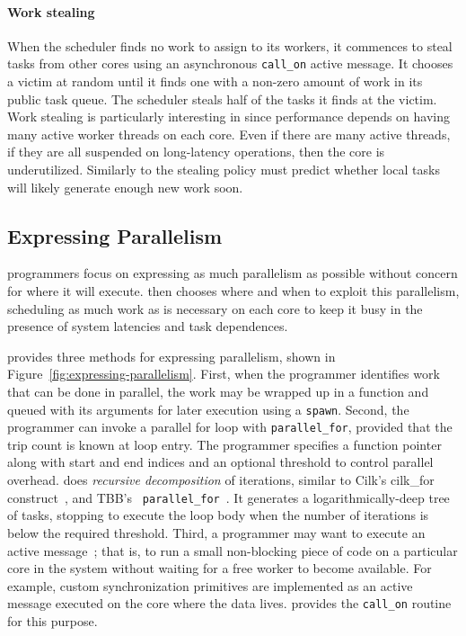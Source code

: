 \paragraph{Work stealing} 
When the scheduler finds no work to assign to its workers, it commences to
steal tasks from other cores using an asynchronous \texttt{call\_on} active
message. It chooses a victim at random until it finds one with a non-zero
amount of work in its public task queue. The scheduler steals half of the
tasks it finds at the victim. Work stealing is particularly interesting in
\Grappa since performance depends on having many active worker threads on each
core. Even if there are many active threads, if they are all suspended on
long-latency operations, then the core is underutilized. Similarly to
\cite{the_hierarchical_workstealing} the
stealing policy must predict whether local tasks will likely
generate enough new work soon.

\subsection{Expressing Parallelism}


\Grappa programmers focus on expressing as much parallelism as possible
without concern for where it will execute. \Grappa then chooses where and when
to exploit this parallelism, scheduling as much work as is necessary on each
core to keep it busy in the presence of system latencies and task dependences.

\Grappa provides three methods for expressing parallelism, shown in
Figure~\ref{fig:expressing-parallelism}. First, when the programmer identifies
work that can be done in parallel, the work may be wrapped up in a function
and queued with its arguments for later execution using a \texttt{spawn}.
Second,
the programmer can invoke a parallel for loop with \texttt{parallel\_for}, provided that the trip count is
known at loop entry. The programmer specifies a function pointer along with
start and end indices and an optional threshold to control parallel overhead.
\Grappa does {\em recursive decomposition} of iterations, similar to Cilk's
cilk\_for construct~\cite {cilkforimplementation}, and TBB's {\tt
parallel\_for}~\cite{intel_tbb}. It generates a logarithmically-deep tree of
tasks, stopping to execute the loop body when the number of iterations is
below the required threshold. Third, a programmer may want to execute an active message~\cite{vonEicken92}; that is, to run a
small non-blocking piece of code on a particular core in the system without waiting for
 a free worker to become available. For example, custom synchronization primitives are implemented as an active message executed on the core where the data
lives. \Grappa provides the \texttt{call\_on} routine for this purpose.

